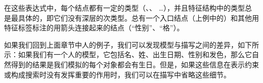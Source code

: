 在这些表达式中，每个结点都有一定的类型（、、 \ldots），并且特征结构中的类型总是最具体的，即它们没有深层的次类型。总有一个入口结点（上例中的）和其他用特征标签标注的用箭头连接起来的结点（“\textsc{性别}”、“\textsc{格}”）。

如果我们回到上面章节中人的例子，我们可以发现模型与描写之间的差异，如下所示：如果我们有一个人的模型，它包括名、姓、出生日期、性别和发色，那么它自然得到的结果是我们模拟的每个对象都会有生日。但是，如果这些信息在表示约束或构成搜索时没有发挥重要的作用时，我们可以在描写中省略这些细节。

